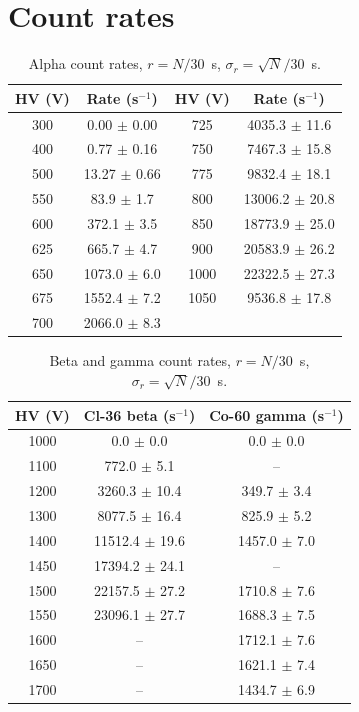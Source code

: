 \documentclass[12pt]{article}
\begin{document}
\appendix
\section{Count rates}
\label{app:rates}

\begin{table}[!htbp]
\centering\small\setlength{\tabcolsep}{4pt}
\begin{tabular}{cc|cc}
\toprule
\textbf{HV (V)} & \textbf{Rate (s$^{-1}$)} & \textbf{HV (V)} & \textbf{Rate (s$^{-1}$)} \\
\midrule
300 & 0.00 $\pm$ 0.00 & 725 & 4035.3 $\pm$ 11.6 \\
400 & 0.77 $\pm$ 0.16 & 750 & 7467.3 $\pm$ 15.8 \\
500 & 13.27 $\pm$ 0.66 & 775 & 9832.4 $\pm$ 18.1 \\
550 & 83.9 $\pm$ 1.7 & 800 & 13006.2 $\pm$ 20.8 \\
600 & 372.1 $\pm$ 3.5 & 850 & 18773.9 $\pm$ 25.0 \\
625 & 665.7 $\pm$ 4.7 & 900 & 20583.9 $\pm$ 26.2 \\
650 & 1073.0 $\pm$ 6.0 & 1000 & 22322.5 $\pm$ 27.3 \\
675 & 1552.4 $\pm$ 7.2 & 1050 & 9536.8 $\pm$ 17.8 \\
700 & 2066.0 $\pm$ 8.3 & & \\
\bottomrule
\end{tabular}
\caption{Alpha count rates, $r = N/30$~s, $\sigma_r = \sqrt{N}/30$~s.}
\label{tab:appalpha}
\end{table}

\begin{table}[!htbp]
\centering\small
\begin{tabular}{ccc}
\toprule
\textbf{HV (V)} & \textbf{Cl-36 beta (s$^{-1}$)} & \textbf{Co-60 gamma (s$^{-1}$)} \\
\midrule
1000 & 0.0 $\pm$ 0.0 & 0.0 $\pm$ 0.0 \\
1100 & 772.0 $\pm$ 5.1 & -- \\
1200 & 3260.3 $\pm$ 10.4 & 349.7 $\pm$ 3.4 \\
1300 & 8077.5 $\pm$ 16.4 & 825.9 $\pm$ 5.2 \\
1400 & 11512.4 $\pm$ 19.6 & 1457.0 $\pm$ 7.0 \\
1450 & 17394.2 $\pm$ 24.1 & -- \\
1500 & 22157.5 $\pm$ 27.2 & 1710.8 $\pm$ 7.6 \\
1550 & 23096.1 $\pm$ 27.7 & 1688.3 $\pm$ 7.5 \\
1600 & -- & 1712.1 $\pm$ 7.6 \\
1650 & -- & 1621.1 $\pm$ 7.4 \\
1700 & -- & 1434.7 $\pm$ 6.9 \\
\bottomrule
\end{tabular}
\caption{Beta and gamma count rates, $r = N/30$~s, $\sigma_r = \sqrt{N}/30$~s.}
\label{tab:appbg}
\end{table}
\end{document}
